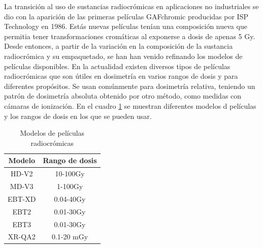La transición al uso de sustancias radiocrómicas en aplicaciones no industriales se dio con la aparición de las primeras películas GAFchromic producidas por ISP Technology en 1986. Estás nuevas películas tenían una composición nueva que permitia tener transformaciones cromáticas al exponerse a dosis de apenas 5 Gy\cite{Williams2011}.\\


Desde entonces, a partir de la variación en la composición de la sustancia radiocrómica y su empaquetado, se han han venido refinando los modelos de películas disponibles. En la actualidad existen diversos tipos de películas radiocrómicas que son útiles en dosimetría en varios rangos de dosis y para diferentes propósitos. Se usan comúnmente para dosimetría relativa, teniendo un patrón de dosimetría absoluta obtenido por otro método, como medidas con cámaras de ionización. En el cuadro \ref{tab:Modelos} se muestran diferentes modelos d películas y los rangos de dosis en los que se pueden usar.\\
\begin{table}[h!]
	\centering
	\begin{tabular}{|c|c|}
		
		\hline 
		Modelo & Rango de dosis \\ 
		\hline 
		HD-V2 & 10-100Gy \\ 
		\hline 
		MD-V3 & 1-100Gy \\ 
		\hline 
		EBT-XD & 0.04-40Gy \\ 
		\hline 
		EBT2 & 0.01-30Gy \\ 
		\hline 
		EBT3 & 0.01-30Gy \\ 
		\hline 
		XR-QA2 & 0.1-20 mGy \\ 
		\hline 
	\end{tabular} 
\caption{Modelos de películas radiocrómicas}
\label{tab:Modelos}
\end{table}

